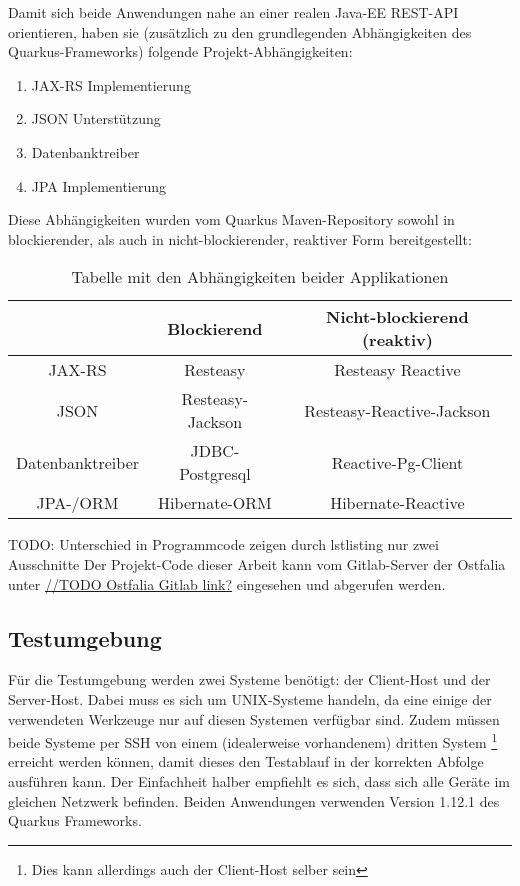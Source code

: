 Damit sich beide Anwendungen nahe an einer realen Java-EE REST-API orientieren, haben
sie (zusätzlich zu den grundlegenden Abhängigkeiten des Quarkus-Frameworks) folgende Projekt-Abhängigkeiten:
\begin{enumerate}
    \item JAX-RS Implementierung
    \item JSON Unterstützung
    \item Datenbanktreiber
    \item JPA Implementierung
\end{enumerate}

Diese Abhängigkeiten wurden vom Quarkus Maven-Repository sowohl in blockierender,
als auch in nicht-blockierender, reaktiver Form bereitgestellt: \cite{MavenQuarkusIO}
\setlength{\tabcolsep}{18pt}
\renewcommand{\arraystretch}{1.5}
\begin{table}[ht!]
    \centering
    \begin{tabular}{| c | c | c |}
        \hline
                         & Blockierend      & Nicht-blockierend (reaktiv) \\
        \hline
        JAX-RS           & Resteasy         & Resteasy Reactive           \\
        \hline
        JSON             & Resteasy-Jackson & Resteasy-Reactive-Jackson   \\
        \hline
        Datenbanktreiber & JDBC-Postgresql  & Reactive-Pg-Client          \\
        \hline
        JPA-/ORM         & Hibernate-ORM    & Hibernate-Reactive          \\
        \hline
    \end{tabular}
    \caption{Tabelle mit den Abhängigkeiten beider Applikationen}
    \label{table:dependencies}
\end{table}

TODO: Unterschied in Programmcode zeigen durch lstlisting nur zwei Ausschnitte
Der Projekt-Code dieser Arbeit kann vom Gitlab-Server der Ostfalia unter
\url{//TODO Ostfalia Gitlab link?} eingesehen und abgerufen werden.

\subsection{Testumgebung}
\label{section:testumgebung}
Für die Testumgebung werden zwei Systeme benötigt: der Client-Host und der Server-Host.
Dabei muss es sich um UNIX-Systeme handeln, da eine einige der verwendeten Werkzeuge nur 
auf diesen Systemen verfügbar sind.
Zudem müssen beide Systeme per SSH von einem (idealerweise vorhandenem) dritten System 
\footnote{Dies kann allerdings auch der Client-Host selber sein} 
erreicht werden können, damit dieses den Testablauf in der korrekten Abfolge ausführen kann. 
Der Einfachheit halber empfiehlt es sich, dass sich alle Geräte im gleichen Netzwerk befinden.
Beiden Anwendungen verwenden Version 1.12.1 des Quarkus Frameworks. 

